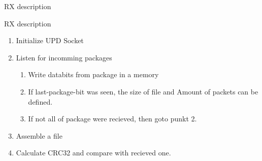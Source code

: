 \documentclass[10pt]{beamer}
\begin{document}
\begin{frame}[fragile]{RX description}
	\begin{block}{RX description}
		\begin{enumerate}
		\item Initialize UPD Socket
		\item Listen for incomming packages
		\begin{enumerate}
			\item Write databits from package in a memory
			\item If last-package-bit was seen, the size of file and Amount of packets can be defined.
			\item If not all of package were recieved, then goto punkt 2.
		\end{enumerate}
		\item Assemble a file
		\item Calculate CRC32 and compare with recieved one.
		\end{enumerate}
	\end{block}
\end{frame}






\end{document}
